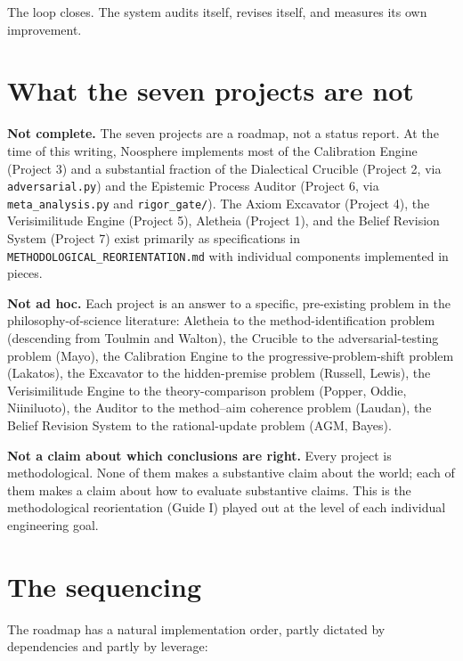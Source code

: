 \documentclass[11pt,letterpaper]{article}
\newcommand{\file}[1]{\texttt{#1}}
\begin{document}
The loop closes. The system audits itself, revises itself, and measures its own improvement.

\section{What the seven projects are not}

\textbf{Not complete.} The seven projects are a roadmap, not a status report. At the time of this writing, Noosphere implements most of the Calibration Engine (Project 3) and a substantial fraction of the Dialectical Crucible (Project 2, via \file{adversarial.py}) and the Epistemic Process Auditor (Project 6, via \file{meta\_analysis.py} and \file{rigor\_gate/}). The Axiom Excavator (Project 4), the Verisimilitude Engine (Project 5), Aletheia (Project 1), and the Belief Revision System (Project 7) exist primarily as specifications in \file{METHODOLOGICAL\_REORIENTATION.md} with individual components implemented in pieces.

\textbf{Not ad hoc.} Each project is an answer to a specific, pre-existing problem in the philosophy-of-science literature: Aletheia to the method-identification problem (descending from Toulmin and Walton), the Crucible to the adversarial-testing problem (Mayo), the Calibration Engine to the progressive-problem-shift problem (Lakatos), the Excavator to the hidden-premise problem (Russell, Lewis), the Verisimilitude Engine to the theory-comparison problem (Popper, Oddie, Niiniluoto), the Auditor to the method--aim coherence problem (Laudan), the Belief Revision System to the rational-update problem (AGM, Bayes).

\textbf{Not a claim about which conclusions are right.} Every project is methodological. None of them makes a substantive claim about the world; each of them makes a claim about how to evaluate substantive claims. This is the methodological reorientation (Guide I) played out at the level of each individual engineering goal.

\section{The sequencing}

The roadmap has a natural implementation order, partly dictated by dependencies and partly by leverage:
\end{document}
